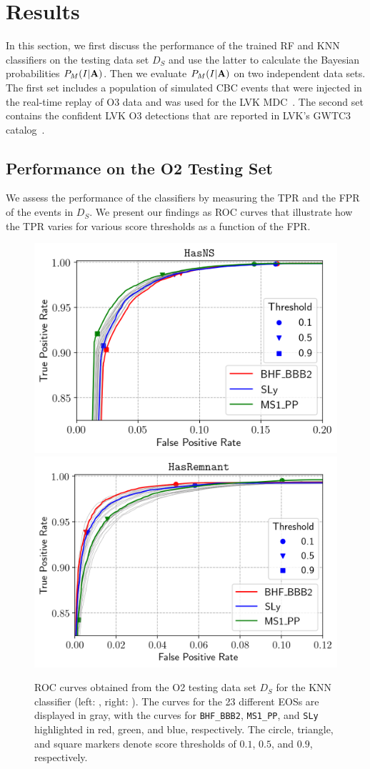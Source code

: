 \section{Results} \label{results}

In this section, we first discuss the performance of the trained \ac{RF} and \ac{KNN} classifiers on the testing data set $D_S$ and use the latter to calculate the Bayesian probabilities
$P_M(I|{\bf A})$. Then we evaluate $P_M(I|{\bf A})$ on two independent data sets. The first set includes a population of simulated \ac{CBC} events that were injected in the real-time
replay of \ac{O3} data and was used for the \ac{LVK} \ac{MDC}~\cite{Chaudhary:2023vec}. The second set contains the confident \ac{LVK} \ac{O3} detections that are reported in \ac{LVK}'s
\ac{GWTC3} catalog~\cite{LIGOScientific:2021djp}.

\subsection{Performance on the O2 Testing Set}

We assess the performance of the classifiers by measuring the \ac{TPR} and the \ac{FPR} of the events in $D_S$. We present our findings as \ac{ROC} curves that illustrate how the \ac{TPR}
varies for various score thresholds as a function of the \ac{FPR}.

\begin{figure}%
\includegraphics[width=0.47\linewidth]{roc_testing_KNN_NS}
\includegraphics[width=0.45\linewidth]{roc_testing_KNN_REM}
\caption{\ac{ROC} curves obtained from the \ac{O2} testing data set $D_S$ for the \ac{KNN} classifier (left: \hasns, right: \hasrem). The curves for the 23 different \ac{EOS}s are displayed in
gray, with the curves for {\tt BHF\_BBB2}, {\tt MS1\_PP}, and {\tt SLy} highlighted in red, green, and blue, respectively. The circle, triangle, and square markers denote score thresholds of
$0.1$, $0.5$, and $0.9$, respectively.}
\label{fig:rocO2_KNN}
\end{figure}

